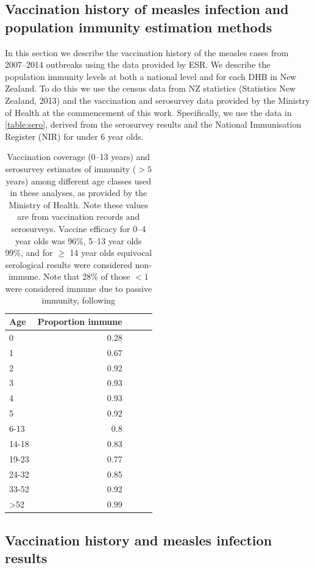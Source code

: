 \documentclass{article}
\begin{document}
\subsection{Vaccination history of measles infection and population immunity estimation methods}
\label{sub:immunestat}

In this section we describe the vaccination history of the measles cases from 2007--2014 outbreaks using the data provided by ESR. We describe the population immunity levels at both a national level and for each DHB in New Zealand. To do this we use the census data from NZ statistics (Statistics New Zealand, 2013) and the vaccination and serosurvey data provided by the Ministry of Health at the commencement of this work. Specifically, we use the data in \autoref{table:sero}, derived from the serosurvey results and the National Immunisation Register (NIR) for under 6 year olds.

\begin{table}[htdp]
\begin{center}
\begin{tabular}{lrrrr}
\hline
Age &  Proportion immune\\
\hline
0  & 0.28\\
1  & 0.67\\
2  & 0.92\\
3	& 0.93\\
4	& 0.93\\
5	& 0.92\\
6-13	& 0.8\\
14-18	& 0.83\\
19-23	& 0.77\\
24-32	& 0.85\\
33-52	& 0.92\\
>52	& 0.99\\
\hline
\end{tabular}
\end{center}
\caption{Vaccination coverage (0--13 years) and serosurvey estimates of immunity ($>5$ years) among different age classes used in these analyses, as provided by the Ministry of Health. Note these values are from vaccination records and serosurveys. Vaccine efficacy for 0--4 year olds was 96\%, 5--13 year olds 99\%, and for $\geq$ 14 year olds equivocal serological results were considered non-immune. Note that 28\% of those $<1$ were considered immune due to passive immunity, following \citep{waaijenborg}}
\label{table:sero}
\end{table}%

\subsection{Vaccination history and measles infection results}
\end{document}
